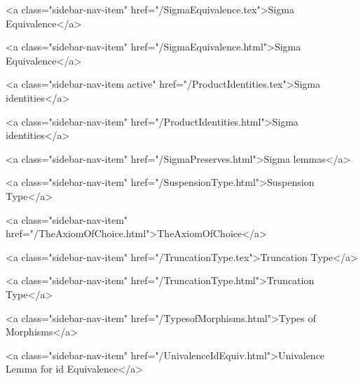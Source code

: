       
    
      
        
          <a class="sidebar-nav-item" href="/SigmaEquivalence.tex">Sigma Equivalence</a>
        
      
    
      
        
          <a class="sidebar-nav-item" href="/SigmaEquivalence.html">Sigma Equivalence</a>
        
      
    
      
        
          <a class="sidebar-nav-item active" href="/ProductIdentities.tex">Sigma identities</a>
        
      
    
      
        
          <a class="sidebar-nav-item" href="/ProductIdentities.html">Sigma identities</a>
        
      
    
      
        
          <a class="sidebar-nav-item" href="/SigmaPreserves.html">Sigma lemmas</a>
        
      
    
      
        
          <a class="sidebar-nav-item" href="/SuspensionType.html">Suspension Type</a>
        
      
    
      
        
          <a class="sidebar-nav-item" href="/TheAxiomOfChoice.html">TheAxiomOfChoice</a>
        
      
    
      
        
          <a class="sidebar-nav-item" href="/TruncationType.tex">Truncation Type</a>
        
      
    
      
        
          <a class="sidebar-nav-item" href="/TruncationType.html">Truncation Type</a>
        
      
    
      
        
          <a class="sidebar-nav-item" href="/TypesofMorphisms.html">Types of Morphisms</a>
        
      
    
      
        
          <a class="sidebar-nav-item" href="/UnivalenceIdEquiv.html">Univalence Lemma for id Equivalence</a>
        

